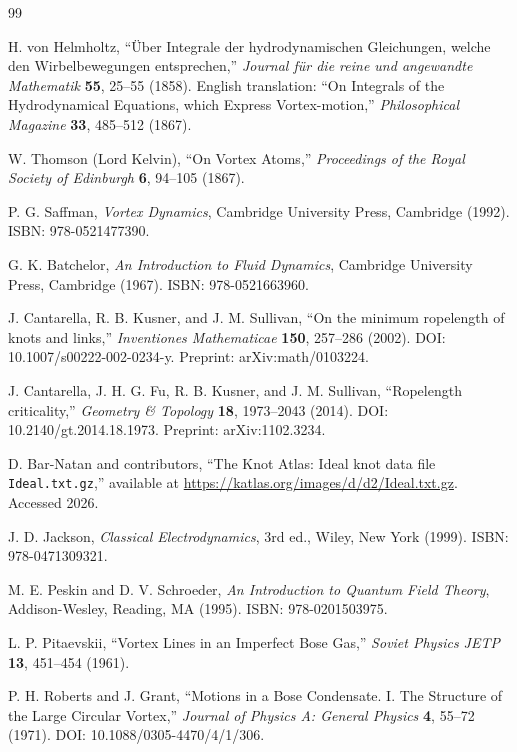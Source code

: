 \documentclass[11pt]{article}
\begin{document}
\begin{thebibliography}{99}

H. von Helmholtz, ``Über Integrale der hydrodynamischen Gleichungen, welche den Wirbelbewegungen entsprechen,''
\emph{Journal für die reine und angewandte Mathematik} \textbf{55}, 25--55 (1858).
English translation: ``On Integrals of the Hydrodynamical Equations, which Express Vortex-motion,''
\emph{Philosophical Magazine} \textbf{33}, 485--512 (1867).

W. Thomson (Lord Kelvin), ``On Vortex Atoms,''
\emph{Proceedings of the Royal Society of Edinburgh} \textbf{6}, 94--105 (1867).

P. G. Saffman, \emph{Vortex Dynamics}, Cambridge University Press, Cambridge (1992).
ISBN: 978-0521477390.

G. K. Batchelor, \emph{An Introduction to Fluid Dynamics}, Cambridge University Press, Cambridge (1967).
ISBN: 978-0521663960.

J. Cantarella, R. B. Kusner, and J. M. Sullivan,
``On the minimum ropelength of knots and links,''
\emph{Inventiones Mathematicae} \textbf{150}, 257--286 (2002).
DOI: 10.1007/s00222-002-0234-y.
Preprint: arXiv:math/0103224.

J. Cantarella, J. H. G. Fu, R. B. Kusner, and J. M. Sullivan,
``Ropelength criticality,''
\emph{Geometry \& Topology} \textbf{18}, 1973--2043 (2014).
DOI: 10.2140/gt.2014.18.1973.
Preprint: arXiv:1102.3234.

D. Bar-Natan and contributors,
``The Knot Atlas: Ideal knot data file \texttt{Ideal.txt.gz},''
available at \url{https://katlas.org/images/d/d2/Ideal.txt.gz}.
Accessed 2026.

J. D. Jackson, \emph{Classical Electrodynamics}, 3rd ed.,
Wiley, New York (1999). ISBN: 978-0471309321.

M. E. Peskin and D. V. Schroeder,
\emph{An Introduction to Quantum Field Theory},
Addison-Wesley, Reading, MA (1995). ISBN: 978-0201503975.

L. P. Pitaevskii,
``Vortex Lines in an Imperfect Bose Gas,''
\emph{Soviet Physics JETP} \textbf{13}, 451--454 (1961).

P. H. Roberts and J. Grant,
``Motions in a Bose Condensate. I. The Structure of the Large Circular Vortex,''
\emph{Journal of Physics A: General Physics} \textbf{4}, 55--72 (1971).
DOI: 10.1088/0305-4470/4/1/306.


\end{thebibliography}
\end{document}
